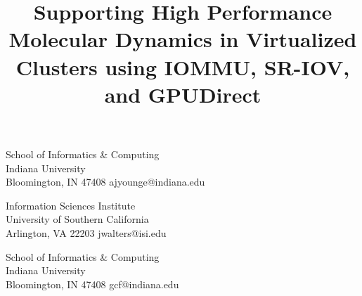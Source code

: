 \documentclass{sigplanconf}
\begin{document}
\setlength{\pdfpageheight}{\paperheight}
\setlength{\pdfpagewidth}{\paperwidth}






\title{Supporting High Performance Molecular Dynamics in Virtualized Clusters using IOMMU, SR-IOV, and GPUDirect}

{School of Informatics \& Computing\\
	Indiana University \\
	Bloomington, IN 47408}
	{ajyounge@indiana.edu}

	{Information Sciences Institute\\
	University of Southern California\\
	Arlington, VA 22203}
	{jwalters@isi.edu}

	{School of Informatics \& Computing\\
	Indiana University \\
	Bloomington, IN 47408}
	{gcf@indiana.edu}


\maketitle
\end{document}
